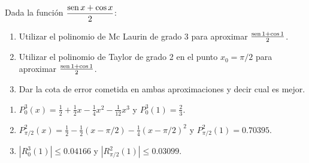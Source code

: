 {Dada la función $\dfrac{\operatorname{sen} x+\cos x}{2}$:
\begin{enumerate}
\item  Utilizar el polinomio de Mc Laurin de grado 3 para aproximar $\frac{\operatorname{sen} 1+\cos 1}{2}$.
\item  Utilizar el polinomio de Taylor de grado 2 en el punto $x_0 = \pi/2$ para aproximar $\frac{\operatorname{sen} 1+\cos 1}{2}$.
\item  Dar la cota de error cometida en ambas aproximaciones y decir cual es mejor.
\end{enumerate}
}
{\begin{enumerate}
\item $P_0^3(x)=\frac{1}{2}+\frac{1}{2}x-\frac{1}{4}x^2-\frac{1}{12}x^3$ y $P_0^3(1)=\frac{2}{3}$.
\item $P_{\pi/2}^2(x)=\frac{1}{2}-\frac{1}{2}(x-\pi/2)-\frac{1}{4}(x-\pi/2)^2$ y  $P_{\pi/2}^2(1)= 0.70395$.
\item $|R_0^3(1)|\leq 0.04166$ y $|R_{\pi/2}^2(1)|\leq 0.03099$.
\end{enumerate}
}
